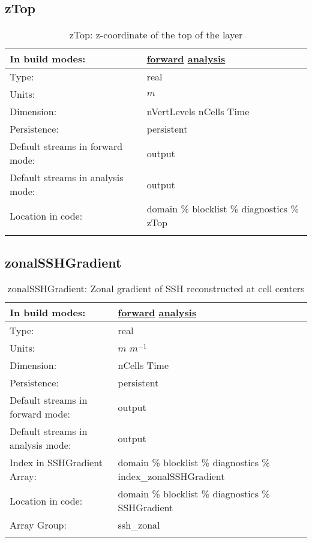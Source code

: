 \subsection[zTop]{zTop}
\label{subsec:var_sec_diagnostics_zTop}
\begin{center}
\begin{longtable}{| p{2.0in} | p{4.0in} |}
        \hline 
        In build modes: & \hyperref[subsec:forward_var_tab_diagnostics]{forward} \hyperref[subsec:analysis_var_tab_diagnostics]{analysis} \\
        \hline 
        Type: & real \\
        \hline 
        Units: & $m$ \\
        \hline 
        Dimension: & nVertLevels nCells Time \\
        \hline 
        Persistence: & persistent \\
        \hline 
		 Default streams in forward mode: &  output \\
        \hline 
		 Default streams in analysis mode: &  output \\
        \hline 
		 Location in code: & domain \% blocklist \% diagnostics \% zTop \\
		 \hline 
    \caption{zTop: z-coordinate of the top of the layer}
\end{longtable}
\end{center}
\subsection[zonalSSHGradient]{zonalSSHGradient}
\label{subsec:var_sec_diagnostics_zonalSSHGradient}
\begin{center}
\begin{longtable}{| p{2.0in} | p{4.0in} |}
        \hline 
        In build modes: & \hyperref[subsec:forward_var_tab_diagnostics]{forward} \hyperref[subsec:analysis_var_tab_diagnostics]{analysis} \\
        \hline 
        Type: & real \\
        \hline 
        Units: & $m$ $m^{-1}$ \\
        \hline 
        Dimension: & nCells Time \\
        \hline 
        Persistence: & persistent \\
        \hline 
		 Default streams in forward mode: &  output \\
        \hline 
		 Default streams in analysis mode: &  output \\
        \hline 
		 Index in SSHGradient Array: & domain \% blocklist \% diagnostics \% index\_zonalSSHGradient \\
		 \hline 
		 Location in code: & domain \% blocklist \% diagnostics \% SSHGradient \\
		 \hline 
		 Array Group: & ssh\_zonal \\
		 \hline 
    \caption{zonalSSHGradient: Zonal gradient of SSH reconstructed at cell centers}
\end{longtable}
\end{center}
